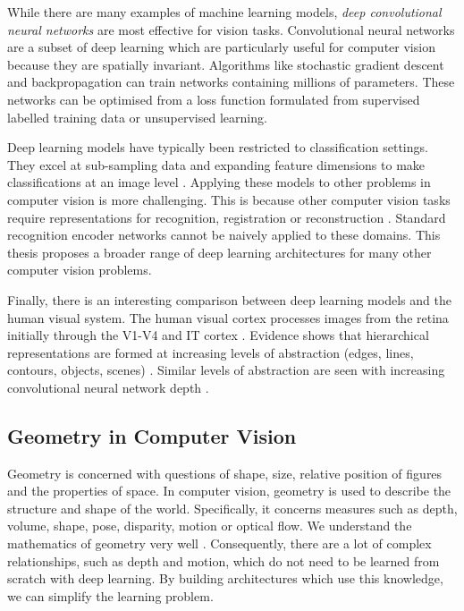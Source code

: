 While there are many examples of machine learning models, \textit{deep convolutional neural networks} \citep{Fukushima1979neocognitron,krizhevsky2012imagenet} are most effective for vision tasks. Convolutional neural networks are a subset of deep learning which are particularly useful for computer vision because they are spatially invariant. Algorithms like stochastic gradient descent \citep{kiefer1952stochastic} and backpropagation \citep{rumelhart1986learning} can train networks containing millions of parameters. These networks can be optimised from a loss function formulated from supervised labelled training data or unsupervised learning.

Deep learning models have typically been restricted to classification settings. They excel at sub-sampling data and expanding feature dimensions to make classifications at an image level \citep{krizhevsky2012imagenet}. Applying these models to other problems in computer vision is more challenging. This is because other computer vision tasks require representations for recognition, registration or reconstruction \citep{cipolla2010computer}. Standard recognition encoder networks \citep{krizhevsky2012imagenet,simonyan2013deep,he2004multiscale} cannot be naively applied to these domains. This thesis proposes a broader range of deep learning architectures for many other computer vision problems.

Finally, there is an interesting comparison between deep learning models and the human visual system. The human visual cortex processes images from the retina initially through the V1-V4 and IT cortex \citep{hubel1962receptive}. Evidence shows that hierarchical representations are formed at increasing levels of abstraction (edges, lines, contours, objects, scenes) \citep{hubel1962receptive}. Similar levels of abstraction are seen with increasing convolutional neural network depth \citep{zeiler2014visualizing}.

\subsection{Geometry in Computer Vision}

Geometry is concerned with questions of shape, size, relative position of figures and the properties of space.
In computer vision, geometry is used to describe the structure and shape of the world. Specifically, it concerns measures such as depth, volume, shape, pose, disparity, motion or optical flow. We understand the mathematics of geometry very well \citep{koenderink1991solid,faugeras1993three,hartley2000}.
Consequently, there are a lot of complex relationships, such as depth and motion, which do not need to be learned from scratch with deep learning.
By building architectures which use this knowledge, we can simplify the learning problem.

